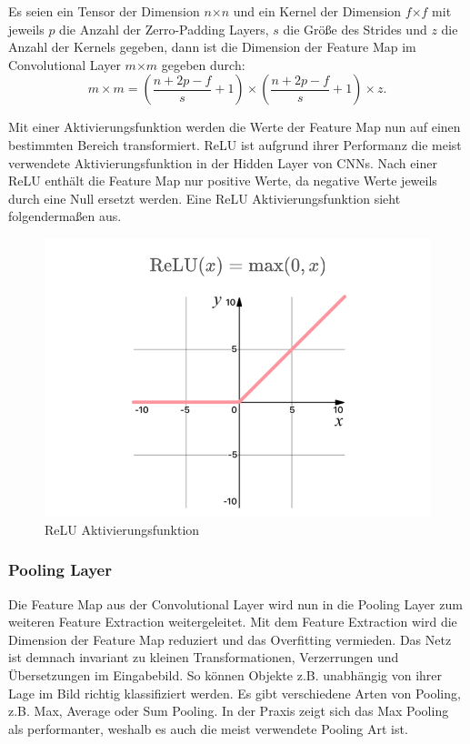 \begin{Definition} \label{def:FeatureMapDimCL}
Es seien ein Tensor der Dimension $n$$\times$$n$ und ein Kernel der Dimension $f$$\times$$f$ mit jeweils $p$ die Anzahl der Zerro-Padding Layers, $s$ die Größe des Strides und $z$ die Anzahl der Kernels gegeben, dann ist die Dimension der Feature Map im Convolutional Layer $m$$\times$$m$ gegeben durch: 
\begin{equation}
m \times m = (\frac{n+2p-f}{s} + 1) \times (\frac{n+2p-f}{s} + 1) \times z. \label{Dimension Feature Map im Convolutional Layer}
\end{equation}
\end{Definition}

Mit einer Aktivierungsfunktion werden die Werte der Feature Map nun auf einen bestimmten Bereich transformiert. ReLU ist aufgrund ihrer Performanz die meist verwendete Aktivierungsfunktion in der Hidden Layer von CNNs. Nach einer ReLU enthält die Feature Map nur positive Werte, da negative Werte jeweils durch eine Null ersetzt werden. Eine ReLU Aktivierungsfunktion sieht folgendermaßen aus.

\begin{figure}[H]
\centering
\includegraphics[width=0.5\linewidth]{pic/Klassifikation/ReLU.png}
\caption{\label{pic:ReLU} ReLU Aktivierungsfunktion}
\end{figure}

\subsubsection{Pooling Layer}
Die Feature Map aus der Convolutional Layer wird nun in die Pooling Layer zum weiteren Feature Extraction weitergeleitet. Mit dem Feature Extraction wird die Dimension der Feature Map reduziert und das Overfitting vermieden. Das Netz ist demnach invariant zu kleinen Transformationen,  Verzerrungen und Übersetzungen im Eingabebild. So können Objekte z.B. unabhängig von ihrer Lage im Bild richtig klassifiziert werden. Es gibt verschiedene Arten von Pooling, z.B. Max, Average oder Sum Pooling. In der Praxis zeigt sich das Max Pooling als performanter, weshalb es auch die meist verwendete Pooling Art ist.

